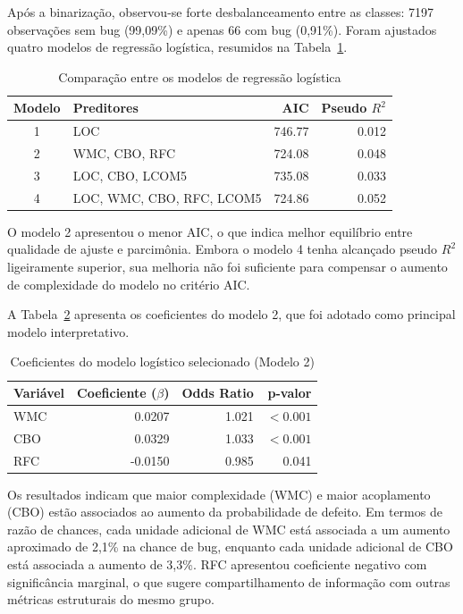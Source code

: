 \documentclass[12pt]{article}
\begin{document}
Após a binarização, observou-se forte desbalanceamento entre as classes: 7197 observações sem bug (99{,}09\%) e apenas 66 com bug (0{,}91\%). Foram ajustados quatro modelos de regressão logística, resumidos na Tabela~\ref{tab:modelos}.

\begin{table}[H]
\centering
\caption{Comparação entre os modelos de regressão logística}
\label{tab:modelos}
\small
\begin{tabular}{clrr}
\toprule
Modelo & Preditores & AIC & Pseudo $R^2$ \\
\midrule
1 & LOC & 746.77 & 0.012 \\
2 & WMC, CBO, RFC & 724.08 & 0.048 \\
3 & LOC, CBO, LCOM5 & 735.08 & 0.033 \\
4 & LOC, WMC, CBO, RFC, LCOM5 & 724.86 & 0.052 \\
\bottomrule
\end{tabular}
\end{table}

O modelo 2 apresentou o menor AIC, o que indica melhor equilíbrio entre qualidade de ajuste e parcimônia. Embora o modelo 4 tenha alcançado pseudo $R^2$ ligeiramente superior, sua melhoria não foi suficiente para compensar o aumento de complexidade do modelo no critério AIC.

A Tabela~\ref{tab:coef} apresenta os coeficientes do modelo 2, que foi adotado como principal modelo interpretativo.

\begin{table}[H]
\centering
\caption{Coeficientes do modelo logístico selecionado (Modelo 2)}
\label{tab:coef}
\small
\begin{tabular}{lrrr}
\toprule
Variável & Coeficiente ($\beta$) & Odds Ratio & p-valor \\
\midrule
WMC & 0.0207 & 1.021 & $< 0.001$ \\
CBO & 0.0329 & 1.033 & $< 0.001$ \\
RFC & -0.0150 & 0.985 & 0.041 \\
\bottomrule
\end{tabular}
\end{table}

Os resultados indicam que maior complexidade (WMC) e maior acoplamento (CBO) estão associados ao aumento da probabilidade de defeito. Em termos de razão de chances, cada unidade adicional de WMC está associada a um aumento aproximado de 2{,}1\% na chance de bug, enquanto cada unidade adicional de CBO está associada a aumento de 3{,}3\%. RFC apresentou coeficiente negativo com significância marginal, o que sugere compartilhamento de informação com outras métricas estruturais do mesmo grupo.
\end{document}
